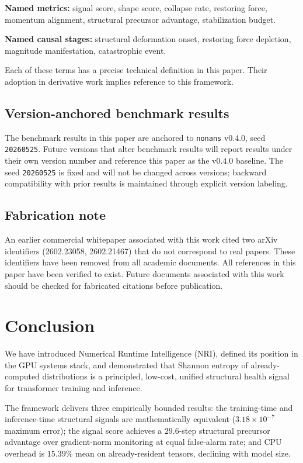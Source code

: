 \documentclass[11pt,a4paper]{article}
\theoremstyle{plain}
\begin{document}
\textbf{Named metrics:}
signal score, shape score, collapse rate, restoring force,
momentum alignment, structural precursor advantage,
stabilization budget.

\textbf{Named causal stages:}
structural deformation onset, restoring force depletion,
magnitude manifestation, catastrophic event.

Each of these terms has a precise technical definition in this paper.
Their adoption in derivative work implies reference to this framework.

\subsection{Version-anchored benchmark results}

The benchmark results in this paper are anchored to
\texttt{nonans} v0.4.0, seed \texttt{20260525}.
Future versions that alter benchmark results will report results
under their own version number and reference this paper as the
v0.4.0 baseline.
The seed \texttt{20260525} is fixed and will not be changed across
versions; backward compatibility with prior results is maintained
through explicit version labeling.

\subsection{Fabrication note}

An earlier commercial whitepaper associated with this work cited two
arXiv identifiers (2602.23058, 2602.21467) that do not correspond to
real papers.
These identifiers have been removed from all academic documents.
All references in this paper have been verified to exist.
Future documents associated with this work should be checked for
fabricated citations before publication.


\section{Conclusion}
\label{sec:conclusion}

We have introduced Numerical Runtime Intelligence (NRI), defined its
position in the GPU systems stack, and demonstrated that Shannon entropy
of already-computed distributions is a principled, low-cost, unified
structural health signal for transformer training and inference.

The framework delivers three empirically bounded results:
the training-time and inference-time structural signals are
mathematically equivalent ($3.18 \times 10^{-7}$ maximum error);
the signal score achieves a $29.6$-step structural precursor advantage
over gradient-norm monitoring at equal false-alarm rate;
and CPU overhead is $15.39\%$ mean on already-resident tensors,
declining with model size.
\end{document}
